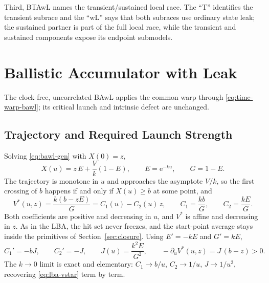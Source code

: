 \documentclass[12pt]{article}
\newcommand{\e}{\mathrm{e}}
\theoremstyle{remark}
\begin{document}
Third, BTAwL names the transient/sustained local race.  The ``T'' identifies the transient subrace and the ``wL'' says that both subraces use ordinary state leak; the sustained partner is part of the full local race, while the transient and sustained components expose its endpoint submodels.

\section{Ballistic Accumulator with Leak}
\label{sec:bawl}
The clock-free, uncorrelated BAwL applies the common warp through
\eqref{eq:time-warp-bawl}; its critical launch and intrinsic defect are
unchanged.
\subsection{Trajectory and Required Launch Strength}
Solving \eqref{eq:bawl-gen} with $X(0)=z$,
\begin{equation}
  X(u) = z\,E + \frac{V}{k}\left(1 - E\right),
  \qquad
  E = \e^{-ku},
  \qquad
  G = 1 - E.
  \label{eq:bawl-traj}
\end{equation}
The trajectory is monotone in $u$ and approaches the asymptote $V/k$, so the first crossing of $b$ happens if and only if $X(u) \ge b$ at some point, and
\begin{equation}
  V^{*}(u,z) = \frac{k(b - zE)}{G} = C_1(u) - C_2(u)\,z,
  \qquad
  C_1 = \frac{kb}{G},
  \qquad
  C_2 = \frac{kE}{G}.
  \label{eq:bawl-vstar}
\end{equation}
Both coefficients are positive and decreasing in $u$, and $V^{*}$ is affine and decreasing in $z$. As in the LBA, the hit set never freezes, and the start-point average stays inside the primitives of Section~\ref{sec:closure}. Using $E' = -kE$ and $G' = kE$,
\begin{equation}
  C_1' = -bJ, \qquad C_2' = -J,
  \qquad
  J(u) = \frac{k^2 E}{G^2},
  \qquad
  -\partial_u V^{*}(u,z) = J\,(b-z) > 0.
  \label{eq:bawl-jac}
\end{equation}
The $k \to 0$ limit is exact and elementary: $C_1 \to b/u$, $C_2 \to 1/u$, $J \to 1/u^2$, recovering \eqref{eq:lba-vstar} term by term.
\end{document}

